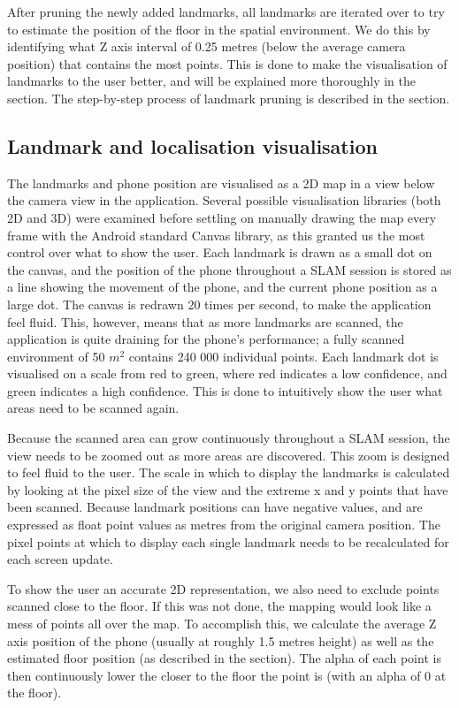 \documentclass{article}
\begin{document}
After pruning the newly added landmarks, all landmarks are iterated over to try to estimate the position of the floor in the spatial environment. We do this by identifying what Z axis interval of 0.25 metres (below the average camera position) that contains the most points. This is done to make the visualisation of landmarks to the user better, and will be explained more thoroughly in the  section. The step-by-step process of landmark pruning is described in the  section.

\subsection{Landmark and localisation visualisation} \label{landmark-visualisation}
The landmarks and phone position are visualised as a 2D map in a view below the camera view in the application. Several possible visualisation libraries (both 2D and 3D) were examined before settling on manually drawing the map every frame with the Android standard Canvas library, as this granted us the most control over what to show the user. Each landmark is drawn as a small dot on the canvas, and the position of the phone throughout a SLAM session is stored as a line showing the movement of the phone, and the current phone position as a large dot. The canvas is redrawn 20 times per second, to make the application feel fluid. This, however, means that as more landmarks are scanned, the application is quite draining for the phone's performance; a fully scanned environment of 50 $m^2$ contains 240 000 individual points. Each landmark dot is visualised on a scale from red to green, where red indicates a low confidence, and green indicates a high confidence. This is done to intuitively show the user what areas need to be scanned again.

Because the scanned area can grow continuously throughout a SLAM session, the view needs to be zoomed out as more areas are discovered. This zoom is designed to feel fluid to the user. The scale in which to display the landmarks is calculated by looking at the pixel size of the view and the extreme x and y points that have been scanned. Because landmark positions can have negative values, and are expressed as float point values as metres from the original camera position. The pixel points at which to display each single landmark needs to be recalculated for each screen update.

To show the user an accurate 2D representation, we also need to exclude points scanned close to the floor. If this was not done, the mapping would look like a mess of points all over the map. To accomplish this, we calculate the average Z axis position of the phone (usually at roughly 1.5 metres height) as well as the estimated floor position (as described in the  section). The alpha of each point is then continuously lower the closer to the floor the point is (with an alpha of 0 at the floor). 
\end{document}
